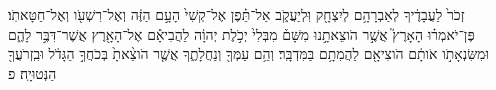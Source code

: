 \documentclass{openreader}
\begin{document}
זְכֹר֙ לַעֲבָדֶ֔יךָ לְאַבְרָהָ֥ם לְיִצְחָ֖ק וּֽלְיַעֲקֹ֑ב אַל־תֵּ֗פֶן אֶל־קְשִׁי֙ הָעָ֣ם הַזֶּ֔ה וְאֶל־רִשְׁעֹ֖ו וְאֶל־חַטָּאתֹֽו׃ 
פֶּן־יֹאמְר֗וּ הָאָרֶץ֮ אֲשֶׁ֣ר הֹוצֵאתָ֣נוּ מִשָּׁם֒ מִבְּלִי֙ יְכֹ֣לֶת יְהוָ֔ה לַהֲבִיאָ֕ם אֶל־הָאָ֖רֶץ אֲשֶׁר־דִּבֶּ֣ר לָהֶ֑ם וּמִשִּׂנְאָתֹ֣ו אֹותָ֔ם הֹוצִיאָ֖ם לַהֲמִתָ֥ם בַּמִּדְבָּֽר׃ 
וְהֵ֥ם עַמְּךָ֖ וְנַחֲלָתֶ֑ךָ אֲשֶׁ֤ר הֹוצֵ֨אתָ֙ בְּכֹחֲךָ֣ הַגָּדֹ֔ל וּבִֽזְרֹעֲךָ֖ הַנְּטוּיָֽה׃ פ 
\end{document}
